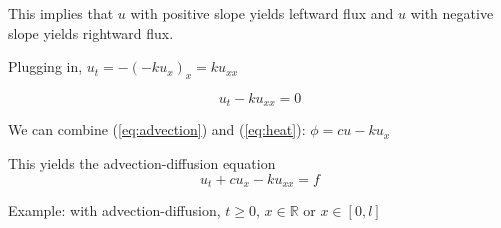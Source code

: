 \documentclass[main.tex]{subfiles}
\begin{document}
This implies that $u$ with positive slope yields leftward flux and $u$ with negative slope yields rightward flux.

Plugging in, $u_t = -(-ku_x)_x = ku_{xx}$

\begin{equation}
u_t - ku_{xx} = 0
\end{equation}

We can combine (\ref{eq:advection}) and (\ref{eq:heat}): $\phi = cu - ku_x$

This yields the advection-diffusion equation
\begin{equation}
    \label{eq:advection-diffusion}
    u_t + cu_x - ku_{xx} = f
\end{equation}

Example: with advection-diffusion, $t\ge0$, $x\in\mathbb{R}$ or $x\in[0, l]$
\end{document}
